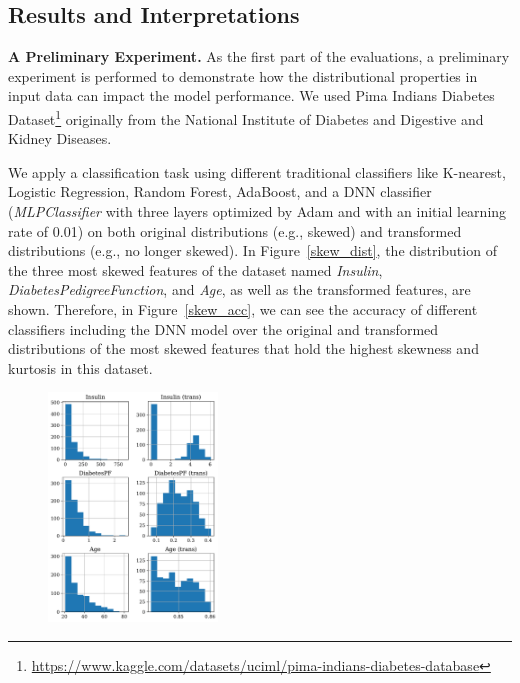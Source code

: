 \subsection{Results and Interpretations}
{\color{blue}
\noindent \textbf{A Preliminary Experiment.} As the first part of the evaluations, a preliminary experiment is performed to demonstrate how the distributional properties in input data can impact the model performance. We used Pima Indians Diabetes Dataset\footnote{\url{https://www.kaggle.com/datasets/uciml/pima-indians-diabetes-database}} originally from the National Institute of Diabetes and Digestive and Kidney Diseases. 

We apply a classification task using different traditional classifiers like K-nearest, Logistic Regression, Random Forest, AdaBoost, and a DNN classifier (\emph{MLPClassifier} with three layers optimized by Adam and with an initial learning rate of 0.01) on both original distributions (e.g., skewed) and transformed distributions (e.g., no longer skewed). 
In Figure~\ref{skew_dist}, the distribution of the three most skewed features of the dataset named \emph{Insulin}, \emph{DiabetesPedigreeFunction}, and \emph{Age}, as well as the transformed features, are shown. Therefore, in Figure~\ref{skew_acc}, we can see the accuracy of different classifiers including the DNN model over the original and transformed distributions of the most skewed features that hold the highest skewness and kurtosis in this dataset.
\begin{figure}[t]  %
\centering
\includegraphics[width=0.4\textwidth]{figures/dist.pdf}

\end{figure}}
